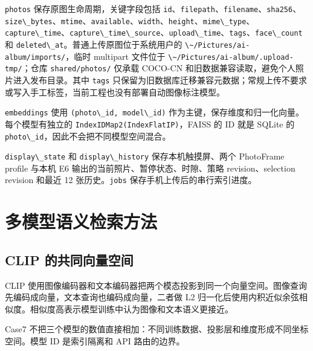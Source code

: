 \passthrough{\lstinline!photos!} 保存原图生命周期，关键字段包括
\passthrough{\lstinline!id!}、\passthrough{\lstinline!filepath!}、\passthrough{\lstinline!filename!}、\passthrough{\lstinline!sha256!}、\passthrough{\lstinline!size\_bytes!}、\passthrough{\lstinline!mtime!}、\passthrough{\lstinline!available!}、\passthrough{\lstinline!width!}、\passthrough{\lstinline!height!}、\passthrough{\lstinline!mime\_type!}、\passthrough{\lstinline!capture\_time!}、\passthrough{\lstinline!capture\_time\_source!}、\passthrough{\lstinline!upload\_time!}、\passthrough{\lstinline!tags!}、\passthrough{\lstinline!face\_count!}
和 \passthrough{\lstinline!deleted\_at!}。普通上传原图位于系统用户的
\passthrough{\lstinline!\~/Pictures/ai-album/imports/!}，临时 multipart
文件位于
\passthrough{\lstinline!\~/Pictures/ai-album/.upload-tmp/!}；仓库
\passthrough{\lstinline!shared/photos/!} 仅承载 COCO-CN
和旧数据兼容读取，避免个人照片进入发布目录。其中
\passthrough{\lstinline!tags!}
只保留为旧数据库迁移兼容元数据；常规上传不要求或写入手工标签，当前工程也没有部署自动图像标注模型。

\passthrough{\lstinline!embeddings!} 使用
\passthrough{\lstinline!(photo\_id, model\_id)!}
作为主键，保存维度和归一化向量。每个模型有独立的
\passthrough{\lstinline!IndexIDMap2(IndexFlatIP)!}，FAISS 的 ID 就是
SQLite 的
\passthrough{\lstinline!photo\_id!}，因此不会把不同模型空间混合。

\passthrough{\lstinline!display\_state!} 和
\passthrough{\lstinline!display\_history!} 保存本机触摸屏、两个
PhotoFrame profile 与本机 E6 输出的当前照片、暂停状态、时隙、策略
revision、selection revision 和最近 12
张历史。\passthrough{\lstinline!jobs!} 保存手机上传后的串行索引进度。

\section{多模型语义检索方法}\label{ux591aux6a21ux578bux8bedux4e49ux68c0ux7d22ux65b9ux6cd5}

\subsection{CLIP
的共同向量空间}\label{clip-ux7684ux5171ux540cux5411ux91cfux7a7aux95f4}

CLIP
使用图像编码器和文本编码器把两个模态投影到同一个向量空间。图像查询先编码成向量，文本查询也编码成向量，二者做
L2
归一化后使用内积近似余弦相似度。相似度高表示模型训练中认为图像和文本语义更接近。

Case7
不把三个模型的数值直接相加：不同训练数据、投影层和维度形成不同坐标空间。模型
ID 是索引隔离和 API 路由的边界。

